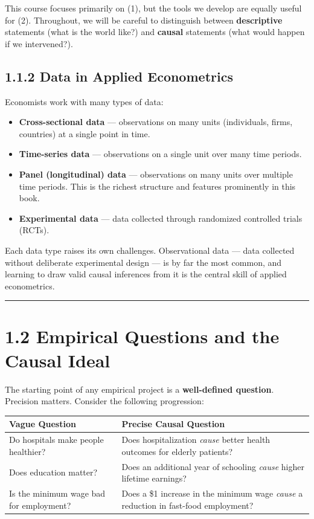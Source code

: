 This course focuses primarily on (1), but the tools we develop are equally useful for (2). Throughout, we will be careful to distinguish between \textbf{descriptive} statements (what is the world like?) and \textbf{causal} statements (what would happen if we intervened?).

\subsection{1.1.2 Data in Applied Econometrics}

Economists work with many types of data:

\begin{itemize}
\item \textbf{Cross-sectional data} --- observations on many units (individuals, firms, countries) at a single point in time.
\item \textbf{Time-series data} --- observations on a single unit over many time periods.
\item \textbf{Panel (longitudinal) data} --- observations on many units over multiple time periods. This is the richest structure and features prominently in this book.
\item \textbf{Experimental data} --- data collected through randomized controlled trials (RCTs).
\end{itemize}

Each data type raises its own challenges. Observational data --- data collected without deliberate experimental design --- is by far the most common, and learning to draw valid causal inferences from it is the central skill of applied econometrics.

\medskip\hrule\medskip

\section{1.2 Empirical Questions and the Causal Ideal}

The starting point of any empirical project is a \textbf{well-defined question}. Precision matters. Consider the following progression:

\begin{center}
\begin{tabular}{@{} l l @{}}
\toprule
\textbf{Vague Question} & \textbf{Precise Causal Question} \\
\midrule
Do hospitals make people healthier? & Does hospitalization \textit{cause} better health outcomes for elderly patients? \\
Does education matter? & Does an additional year of schooling \textit{cause} higher lifetime earnings? \\
Is the minimum wage bad for employment? & Does a \$1 increase in the minimum wage \textit{cause} a reduction in fast-food employment? \\
\bottomrule
\end{tabular}
\end{center}

